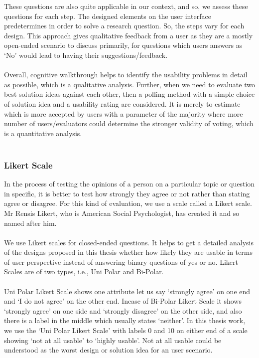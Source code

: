 These questions are also quite applicable in our context, and so, we assess these questions for each step. The designed elements on the user interface predetermines in order to solve a research question. So, the steps vary for each design. This approach gives qualitative feedback from a user as they are a mostly open-ended scenario to discuss primarily, for questions which users answers as ‘No’ would lead to having their suggestions/feedback. \\ \\

Overall, cognitive walkthrough helps to identify the usability problems in detail as possible, which is a qualitative analysis. Further, when we need to evaluate two best solution ideas against each other, then a polling method with a simple choice of solution idea and a usability rating are considered. It is merely to estimate which is more accepted by users with a parameter of the majority where more number of users/evaluators could determine the stronger validity of voting, which is a quantitative analysis. \\ \\

\clearpage

\subsubsection{Likert Scale}
\hfill \break
In the process of testing the opinions of a person on a particular topic or question in specific, it is better to test how strongly they agree or not rather than stating agree or disagree. For this kind of evaluation, we use a scale called a Likert scale. \cite{likert} Mr Rensis Likert, who is American Social Psychologist, has created it and so named after him. \\ \\

We use Likert scales for closed-ended questions. It helps to get a detailed analysis of the designs proposed in this thesis whether how likely they are usable in terms of user perspective instead of answering binary questions of yes or no. Likert Scales are of two types, i.e., Uni Polar and Bi-Polar. \\ \\

Uni Polar Likert Scale shows one attribute let us say ‘strongly agree’ on one end and ‘I do not agree’ on the other end. Incase of Bi-Polar Likert Scale it shows ‘strongly agree’ on one side and ‘strongly disagree’ on the other side, and also there is a label in the middle which usually states ‘neither’. In this thesis work, we use the ‘Uni Polar Likert Scale’ with labels 0 and 10 on either end of a scale showing ‘not at all usable’ to ‘highly usable’. Not at all usable could be understood as the worst design or solution idea for an user scenario.\\ \\

